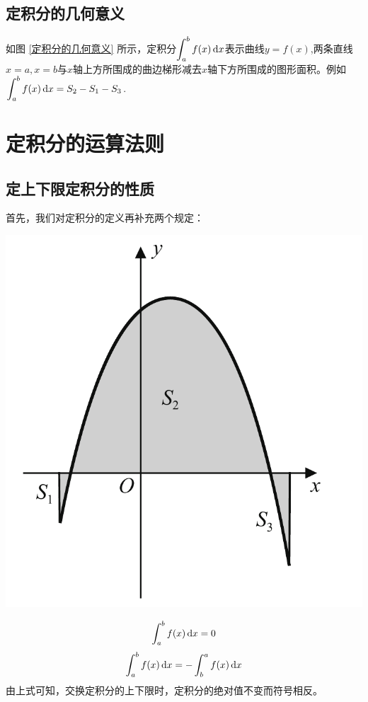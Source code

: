 \noindent
\begin{minipage}{0.6\linewidth}
	\subsection{定积分的几何意义}
\hspace*{2em} 如图 \ref{定积分的几何意义} 所示，定积分$\displaystyle\int_{a}^{b}f(x) \,{\rm{d}} x$表示曲线$y=f(x)$,两条直线$x=a,x=b$与$x$轴上方所围成的曲边梯形减去$x$轴下方所围成的图形面积。例如$\displaystyle\int_{a}^{b}f(x) \,{\rm{d}} x=S_2-S_1-S_3$.
\vspace*{1.5em}

\section{定积分的运算法则}
\subsection{定上下限定积分的性质}
\hspace*{2em} 首先，我们对定积分的定义再补充两个规定：
\end{minipage}
\begin{minipage}{0.4\linewidth}
	\centering
	\includegraphics[width=0.75\linewidth]{pic/C-4/定积分几何意义}
	\vspace*{-1em}
	\label{定积分的几何意义}
\end{minipage}

\begin{equation}
	\int_{a}^{b}f(x) \,{\rm{d}} x=0
\end{equation}
\begin{equation}
	\int_{a}^{b}f(x) \,{\rm{d}} x=-\int_{b}^{a}f(x) \,{\rm{d}} x
\end{equation}
由上式可知，交换定积分的上下限时，定积分的绝对值不变而符号相反。\\

